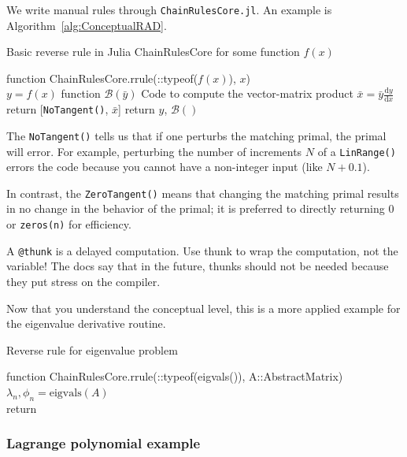 \documentclass[10pt]{article}
\newcommand{\dd}[2]{\frac{\textrm{d} #1}{\textrm{d} #2}}
\newcommand{\mcal}[1]{\mathcal{#1}} %
\newcommand{\tn}[1]{\textrm{#1}}
\begin{document}
We write manual rules through \texttt{ChainRulesCore.jl}.
An example is Algorithm~\ref{alg:ConceptualRAD}.
\begin{algorithm}[htb!]
	\caption{\label{alg:ConceptualRAD} Basic reverse rule in Julia ChainRulesCore for some function $f(x)$}
	\DontPrintSemicolon
	function ChainRulesCore.rrule(::typeof($f(x)$), $x$)\\
	\quad $y = f(x)$ 
	\quad function $\mcal{B}(\bar{y})$\;
	\quad \quad Code to compute the vector-matrix product $\bar{x}= \bar{y} \dd{y}{x}$ 
	\quad return [\texttt{NoTangent()}, $\bar{x}$] 
	return $y$, $\mcal{B}()$
\end{algorithm}

The \texttt{NoTangent()} tells us that if one perturbs the matching primal, the primal will error.
For example, perturbing the number of increments $N$ of a \texttt{LinRange()} errors the code because you cannot have a non-integer input (like $N+0.1$).

In contrast, the \texttt{ZeroTangent()} means that changing the matching primal results in no change in the behavior of the primal;
it is preferred to directly returning 0 or \texttt{zeros(n)} for efficiency.

A \texttt{@thunk} is a delayed computation.
Use thunk to wrap the computation, not the variable!
The docs say that in the future, thunks should not be needed because they put stress on the compiler.

Now that you understand the conceptual level, this is a more applied example for the eigenvalue derivative routine.
\begin{algorithm}[htb!]
	\caption{\label{alg:EigenRAD} Reverse rule for eigenvalue problem}
	function ChainRulesCore.rrule(::typeof(eigvals()), A::AbstractMatrix)\\
	\quad $\lambda_n, \phi_n = \tn{eigvals}(A)$ \\
	return
\end{algorithm}

\subsubsection{Lagrange polynomial example}
\end{document}
